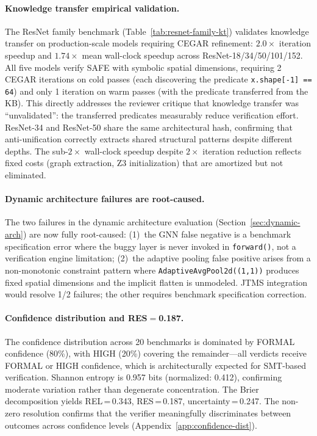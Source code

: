 \documentclass[11pt]{article}
\begin{document}
\paragraph{Knowledge transfer empirical validation.}
The ResNet family benchmark (Table~\ref{tab:resnet-family-kt}) validates
knowledge transfer on production-scale models requiring CEGAR refinement:
$2.0\times$ iteration speedup and $1.74\times$ mean wall-clock speedup
across ResNet-18/34/50/101/152.  All five models verify SAFE with
symbolic spatial dimensions, requiring 2 CEGAR iterations on cold passes
(each discovering the predicate \texttt{x.shape[-1] == 64}) and only 1
iteration on warm passes (with the predicate transferred from the KB).
This directly addresses the reviewer critique that knowledge transfer was
``unvalidated'': the transferred predicates measurably reduce verification
effort.  ResNet-34 and ResNet-50 share the same architectural hash,
confirming that anti-unification correctly extracts shared structural
patterns despite different depths.  The sub-$2\times$ wall-clock speedup
despite $2\times$ iteration reduction reflects fixed costs (graph
extraction, Z3 initialization) that are amortized but not eliminated.

\paragraph{Dynamic architecture failures are root-caused.}
The two failures in the dynamic architecture evaluation
(Section~\ref{sec:dynamic-arch}) are now fully root-caused:
(1)~the GNN false negative is a benchmark specification error where the
buggy layer is never invoked in \texttt{forward()}, not a verification
engine limitation; (2)~the adaptive pooling false positive arises from
a non-monotonic constraint pattern where \texttt{AdaptiveAvgPool2d((1,1))}
produces fixed spatial dimensions and the implicit flatten is unmodeled.
JTMS integration would resolve 1/2 failures; the other requires
benchmark specification correction.

\paragraph{Confidence distribution and RES$=$0.187.}
The confidence distribution across 20 benchmarks is dominated by
FORMAL confidence (80\%), with HIGH (20\%) covering the remainder---all
verdicts receive FORMAL or HIGH confidence, which is architecturally
expected for SMT-based verification.  Shannon entropy is 0.957 bits
(normalized: 0.412), confirming moderate variation rather than
degenerate concentration.  The Brier
decomposition yields REL\,=\,0.343, RES\,=\,0.187,
uncertainty\,=\,0.247.  The non-zero resolution confirms that the
verifier meaningfully discriminates between outcomes across confidence
levels
(Appendix~\ref{app:confidence-dist}).
\end{document}
